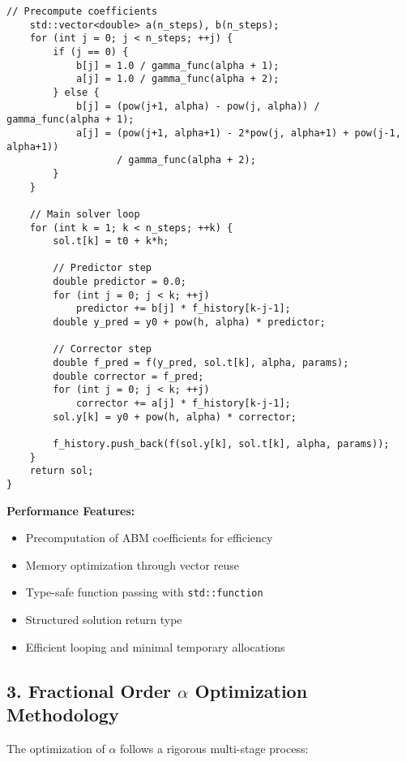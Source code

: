 \documentclass[a4paper,12pt]{article}
\begin{document}
\begin{lstlisting}[style=cpp, caption={C++ implementation of ABM solver for FDEs}, label={lst:cpp-fde}]
    // Precompute coefficients
    std::vector<double> a(n_steps), b(n_steps);
    for (int j = 0; j < n_steps; ++j) {
        if (j == 0) {
            b[j] = 1.0 / gamma_func(alpha + 1);
            a[j] = 1.0 / gamma_func(alpha + 2);
        } else {
            b[j] = (pow(j+1, alpha) - pow(j, alpha)) / gamma_func(alpha + 1);
            a[j] = (pow(j+1, alpha+1) - 2*pow(j, alpha+1) + pow(j-1, alpha+1))
                   / gamma_func(alpha + 2);
        }
    }
    
    // Main solver loop
    for (int k = 1; k < n_steps; ++k) {
        sol.t[k] = t0 + k*h;
        
        // Predictor step
        double predictor = 0.0;
        for (int j = 0; j < k; ++j)
            predictor += b[j] * f_history[k-j-1];
        double y_pred = y0 + pow(h, alpha) * predictor;
        
        // Corrector step
        double f_pred = f(y_pred, sol.t[k], alpha, params);
        double corrector = f_pred;
        for (int j = 0; j < k; ++j)
            corrector += a[j] * f_history[k-j-1];
        sol.y[k] = y0 + pow(h, alpha) * corrector;
        
        f_history.push_back(f(sol.y[k], sol.t[k], alpha, params));
    }
    return sol;
}
\end{lstlisting}

\textbf{Performance Features:}
\begin{itemize}[leftmargin=*]
    \item Precomputation of ABM coefficients for efficiency
    \item Memory optimization through vector reuse
    \item Type-safe function passing with \texttt{std::function}
    \item Structured solution return type
    \item Efficient looping and minimal temporary allocations
\end{itemize}

\subsection*{3. Fractional Order $\alpha$ Optimization Methodology}

The optimization of $\alpha$ follows a rigorous multi-stage process:
\end{document}
